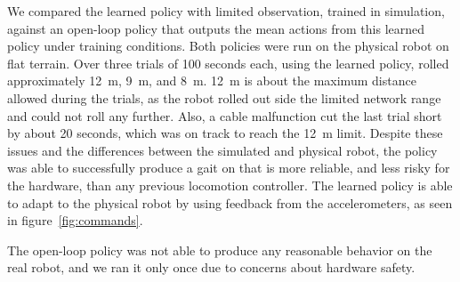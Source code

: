 We compared the learned policy with limited observation, trained in simulation, against an open-loop policy that outputs the mean actions from this learned policy under training conditions. Both policies were run on the physical \SB{} robot on flat terrain. 
Over three trials of 100 seconds each, using the learned policy, \SB{} rolled approximately \SI{12}{\meter}, \SI{9}{\meter}, and \SI{8}{\meter}.
\SI{12}{\meter} is about the maximum distance allowed during the trials, as the robot rolled out side the limited network range and could not roll any further.
Also, a cable malfunction cut the last trial short by about 20 seconds, which was on track to reach the \SI{12}{\meter} limit. 
Despite these issues and the differences between the simulated and physical robot, the policy was able to successfully produce a gait on \SB{} that is more reliable, and less risky for the hardware, than any previous locomotion controller.
The learned policy is able to adapt to the physical \SB{} robot by using feedback from the accelerometers, as seen in figure~\ref{fig:commands}.

The open-loop policy was not able to produce any reasonable behavior on the real robot, and we ran it only once due to concerns about hardware safety. 


